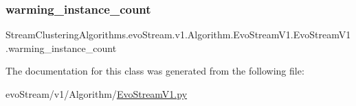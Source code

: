 \subsubsection{\texorpdfstring{warming\+\_\+instance\+\_\+count}{warming\_instance\_count}}
{\footnotesize\ttfamily Stream\+Clustering\+Algorithms.\+evo\+Stream.\+v1.\+Algorithm.\+Evo\+Stream\+V1.\+Evo\+Stream\+V1.\+warming\+\_\+instance\+\_\+count}



The documentation for this class was generated from the following file\+:\begin{DoxyCompactItemize}
\item 
evo\+Stream/v1/\+Algorithm/\hyperlink{EvoStreamV1_8py}{Evo\+Stream\+V1.\+py}\end{DoxyCompactItemize}
